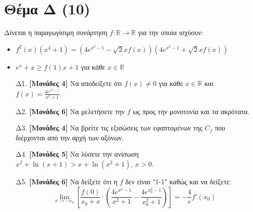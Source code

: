 \documentclass[14pt]{extarticle}
\begin{document}
\section*{Θέμα Δ (10)}
Δίνεται η παραγωγίσιμη συνάρτηση $f:\mathbb{R}\to\mathbb{R}$ για την οποία ισχύουν:
\begin{itemize}
 \item $f^2(x)(x^4+1)=\left(4e^{x^2-1}-\sqrt{2}xf(x)\right)\left(4e^{x^2-1}+\sqrt{2}xf(x)\right)$
 \item $e^x+x\ge f(1)x+1$ για κάθε $x\in\mathbb{R}$
\end{itemize}
\begin{enumerate}
 \item[Δ1.] \textbf{[Μονάδες 4]} Να αποδείξετε ότι $f(x)\ne 0$ για κάθε $x\in\mathbb{R}$ και $f(x)=\frac{4e^{x^2-1}}{x^2+1}$.
 \item[Δ2.] \textbf{[Μονάδες 6]} Να μελετήσετε την $f$ ως προς την μονοτονία και τα ακρότατα.
 \item[Δ3.] \textbf{[Μονάδες 4]} Να βρείτε τις εξισώσεις των εφαπτομένων της $C_f$ που διέρχονται από την αρχή των αξόνων.
 \item[Δ4.] \textbf{[Μονάδες 5]} Να λύσετε την ανίσωση $x^2+\ln(x+1)>x+\ln(x^2+1)$, $x>0$.
 \item[Δ5.] \textbf{[Μονάδες 6]} Να δείξετε ότι η $f$ δεν είναι "1-1" καθώς και να δείξετε:
       $$\lim_{x\to -x_0}\left[\frac{f(0)}{x_0+x}\cdot\left(\frac{4e^{x^2-1}}{x^2+1}-\frac{4e^{x_0^2-1}}{x_0^2+1}\right)\right]=-\frac{4}{e}f'(x_0)$$
\end{enumerate}
\end{document}
